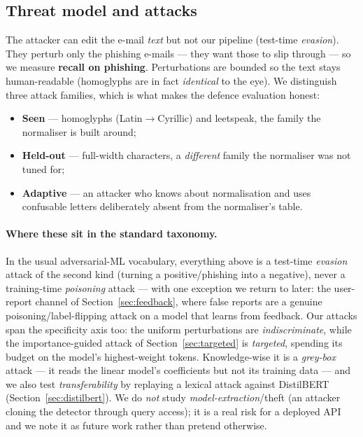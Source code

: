 \documentclass[11pt]{article}
\begin{document}
\subsection{Threat model and attacks}
\label{sec:threat}
The attacker can edit the e-mail \emph{text} but not our pipeline (test-time
\emph{evasion}). They perturb only the phishing e-mails --- they want those to slip
through --- so we measure \textbf{recall on phishing}. Perturbations are bounded so
the text stays human-readable (homoglyphs are in fact \emph{identical} to the eye).
We distinguish three attack families, which is what makes the defence evaluation
honest:
\begin{itemize}[nosep]
  \item \textbf{Seen} --- homoglyphs (Latin$\rightarrow$Cyrillic) and leetspeak, the
  family the normaliser is built around;
  \item \textbf{Held-out} --- full-width characters, a \emph{different} family the
  normaliser was not tuned for;
  \item \textbf{Adaptive} --- an attacker who knows about normalisation and uses
  confusable letters deliberately absent from the normaliser's table.
\end{itemize}

\paragraph{Where these sit in the standard taxonomy.} In the usual adversarial-ML
vocabulary, everything above is a test-time \emph{evasion} attack of the second kind
(turning a positive/phishing into a negative), never a training-time \emph{poisoning}
attack --- with one exception we return to later: the user-report channel of
Section~\ref{sec:feedback}, where false reports are a genuine poisoning/label-flipping
attack on a model that learns from feedback. Our attacks span the specificity axis too:
the uniform perturbations are \emph{indiscriminate}, while the importance-guided attack of
Section~\ref{sec:targeted} is \emph{targeted}, spending its budget on the model's
highest-weight tokens. Knowledge-wise it is a \emph{grey-box} attack --- it reads the linear
model's coefficients but not its training data --- and we also test \emph{transferability}
by replaying a lexical attack against DistilBERT (Section~\ref{sec:distilbert}). We do
\emph{not} study \emph{model-extraction}/theft (an attacker cloning the detector through
query access); it is a real risk for a deployed API and we note it as future work rather
than pretend otherwise.
\end{document}
